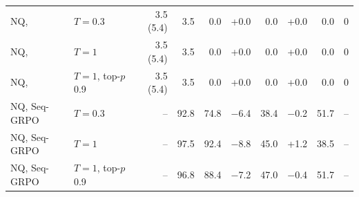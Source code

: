 \begin{table}[h]
{\begin{tabular}{l l r r r r r r r r}
\addlinespace
NQ, \methodp{} & $T=0.3$ & 3.5 (5.4) & 3.5 & 0.0 & +0.0 & 0.0 & +0.0 & 0.0 & 0 \\
NQ, \methodp{} & $T=1$ & 3.5 (5.4) & 3.5 & 0.0 & +0.0 & 0.0 & +0.0 & 0.0 & 0 \\
NQ, \methodp{} & $T=1$, top-$p$ 0.9 & 3.5 (5.4) & 3.5 & 0.0 & +0.0 & 0.0 & +0.0 & 0.0 & 0 \\
\addlinespace
NQ, Seq-GRPO & $T=0.3$ & -- & 92.8 & 74.8 & $-$6.4 & 38.4 & $-$0.2 & 51.7 & -- \\
NQ, Seq-GRPO & $T=1$ & -- & 97.5 & 92.4 & $-$8.8 & 45.0 & +1.2 & 38.5 & -- \\
NQ, Seq-GRPO & $T=1$, top-$p$ 0.9 & -- & 96.8 & 88.4 & $-$7.2 & 47.0 & $-$0.4 & 51.7 & -- \\
\bottomrule
\end{tabular}}
\end{table}
